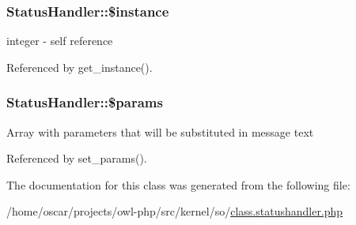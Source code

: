 \subsubsection[{\$instance}]{\setlength{\rightskip}{0pt plus 5cm}StatusHandler::\$instance}\label{classStatusHandler_a93400d190e7612dd53fbf0be529a96ee}
integer -\/ self reference 

Referenced by get\_\-instance().

\subsubsection[{\$params}]{\setlength{\rightskip}{0pt plus 5cm}StatusHandler::\$params}\label{classStatusHandler_a599f9c9284340399fdcb7dac9cb7856f}
Array with parameters that will be substituted in message text 

Referenced by set\_\-params().



The documentation for this class was generated from the following file:\begin{DoxyCompactItemize}
\item 
/home/oscar/projects/owl-\/php/src/kernel/so/\hyperlink{class_8statushandler_8php}{class.statushandler.php}\end{DoxyCompactItemize}
